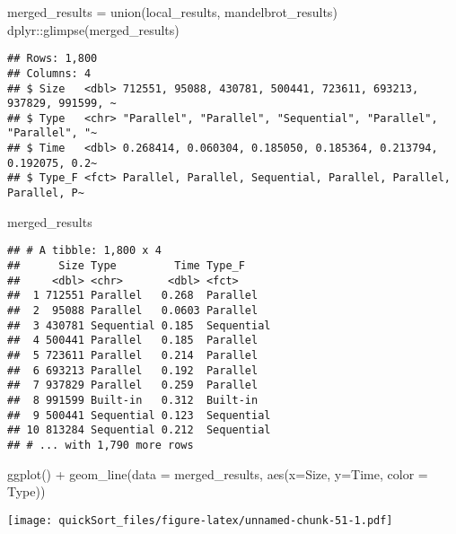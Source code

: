 \documentclass[
]{article}
\newenvironment{Shaded}{\begin{snugshade}}{\end{snugshade}}
\newcommand{\AttributeTok}[1]{\textcolor[rgb]{0.77,0.63,0.00}{#1}}
\newcommand{\FunctionTok}[1]{\textcolor[rgb]{0.00,0.00,0.00}{#1}}
\newcommand{\NormalTok}[1]{#1}
\newcommand{\OtherTok}[1]{\textcolor[rgb]{0.56,0.35,0.01}{#1}}
\newcommand{\SpecialCharTok}[1]{\textcolor[rgb]{0.00,0.00,0.00}{#1}}
\begin{document}
\begin{Shaded}
\begin{Highlighting}[]
\NormalTok{merged\_results }\OtherTok{=} \FunctionTok{union}\NormalTok{(local\_results, mandelbrot\_results)}
\NormalTok{dplyr}\SpecialCharTok{::}\FunctionTok{glimpse}\NormalTok{(merged\_results)}
\end{Highlighting}
\end{Shaded}

\begin{verbatim}
## Rows: 1,800
## Columns: 4
## $ Size   <dbl> 712551, 95088, 430781, 500441, 723611, 693213, 937829, 991599, ~
## $ Type   <chr> "Parallel", "Parallel", "Sequential", "Parallel", "Parallel", "~
## $ Time   <dbl> 0.268414, 0.060304, 0.185050, 0.185364, 0.213794, 0.192075, 0.2~
## $ Type_F <fct> Parallel, Parallel, Sequential, Parallel, Parallel, Parallel, P~
\end{verbatim}

\begin{Shaded}
\begin{Highlighting}[]
\NormalTok{merged\_results}
\end{Highlighting}
\end{Shaded}

\begin{verbatim}
## # A tibble: 1,800 x 4
##      Size Type         Time Type_F    
##     <dbl> <chr>       <dbl> <fct>     
##  1 712551 Parallel   0.268  Parallel  
##  2  95088 Parallel   0.0603 Parallel  
##  3 430781 Sequential 0.185  Sequential
##  4 500441 Parallel   0.185  Parallel  
##  5 723611 Parallel   0.214  Parallel  
##  6 693213 Parallel   0.192  Parallel  
##  7 937829 Parallel   0.259  Parallel  
##  8 991599 Built-in   0.312  Built-in  
##  9 500441 Sequential 0.123  Sequential
## 10 813284 Sequential 0.212  Sequential
## # ... with 1,790 more rows
\end{verbatim}

\begin{Shaded}
\begin{Highlighting}[]
\FunctionTok{ggplot}\NormalTok{() }\SpecialCharTok{+}               
  \FunctionTok{geom\_line}\NormalTok{(}\AttributeTok{data =}\NormalTok{ merged\_results, }\FunctionTok{aes}\NormalTok{(}\AttributeTok{x=}\NormalTok{Size, }\AttributeTok{y=}\NormalTok{Time, }\AttributeTok{color =}\NormalTok{ Type))}
\end{Highlighting}
\end{Shaded}

\texttt{[image: quickSort\_files/figure-latex/unnamed-chunk-51-1.pdf]}
\end{document}
